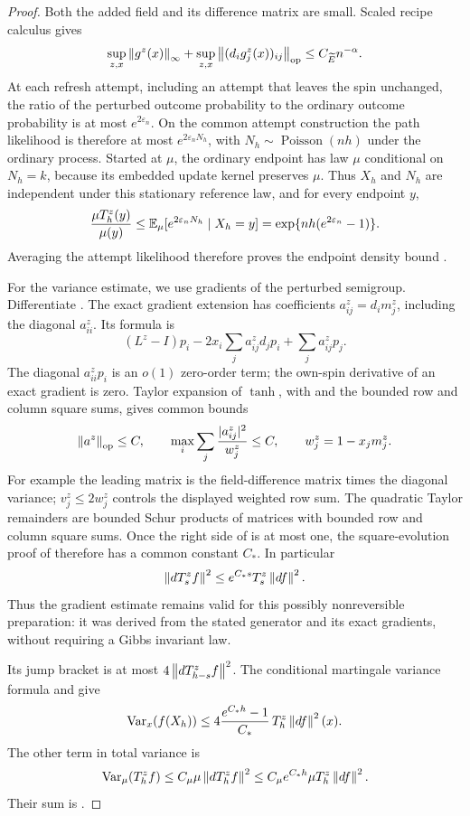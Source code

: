\begin{proof}
Both the added field and its difference matrix are small.  Scaled recipe
calculus gives
\begin{equation}
 \sup_{z,x}\left\lVert g^z(x)\right\rVert_\infty+
 \sup_{z,x}\left\lVert (d_i g_j^z(x))_{ij}\right\rVert_{\mathrm{op}}
 \le C_{\widetilde E}n^{-\alpha}.
 \label{eq:cutoff-small-perturbation}
\end{equation}
At each refresh attempt, including an attempt that leaves the spin
unchanged, the ratio of the perturbed outcome probability to the
ordinary outcome probability is at most $e^{2\varepsilon_n}$.
On the common attempt construction the path likelihood is therefore
at most $e^{2\varepsilon_n N_h}$, with
$N_h\sim\operatorname{Poisson}(nh)$ under the ordinary process.
Started at $\mu$, the ordinary endpoint has law $\mu$ conditional
on $N_h=k$, because its embedded update kernel preserves $\mu$.
Thus $X_h$ and $N_h$ are independent under this stationary reference
law, and for every endpoint $y$,
\[
 \frac{\mu T_h^z(y)}{\mu(y)}
 \le\mathbb E_\mu[e^{2\varepsilon_n N_h}\mid X_h=y]
 =\exp\{nh(e^{2\varepsilon_n}-1)\}.
\]
Averaging the attempt likelihood therefore proves the endpoint density
bound .

For the variance estimate, we use gradients of the perturbed semigroup.
Differentiate
.  The exact gradient
extension has coefficients $a_{ij}^z=d_im_j^z$, including the
diagonal $a_{ii}^z$.  Its formula is
\[
 (L^z-I)p_i-2x_i\sum_j a_{ij}^z d_jp_i+\sum_j a_{ij}^z p_j.
\]
The diagonal $a_{ii}^z p_i$ is an $o(1)$ zero-order term; the
own-spin derivative of an exact gradient is zero.  Taylor expansion
of $\tanh$, with  and the
bounded row and column square sums, gives common bounds
\[
 \left\lVert a^z\right\rVert_{\mathrm{op}}\le C,\qquad
 \max_i\sum_j\frac{|a_{ij}^z|^2}{w_j^z}\le C,
 \qquad w_j^z=1-x_jm_j^z.
\]
For example the leading matrix is the field-difference matrix times
the diagonal variance; $v_j^z\le2w_j^z$ controls the displayed
weighted row sum.  The quadratic Taylor remainders are bounded
Schur products of matrices with bounded row and column square sums.
Once the right side of  is at most
one, the square-evolution proof of  therefore
has a common constant $C_*$.  In particular
\begin{equation}
 \left\lVert dT_s^zf\right\rVert^2\le e^{C_*s}T_s^z\left\lVert df\right\rVert^2.
 \label{eq:cutoff-preparation-gradient}
\end{equation}
Thus the gradient estimate remains valid for this possibly nonreversible
preparation: it was derived from the stated generator and its exact
gradients, without requiring a Gibbs invariant law.

Its jump bracket is at most $4\left\lVert dT_{h-s}^zf\right\rVert^2$.
The conditional martingale variance formula and
 give
\[
 \operatorname{Var}_x(f(X_h))
 \le4\frac{e^{C_*h}-1}{C_*}\,T_h^z\left\lVert df\right\rVert^2(x).
\]
The other term in total variance is
\[
 \operatorname{Var}_\mu(T_h^zf)
 \le C_\mu\mu\left\lVert dT_h^zf\right\rVert^2
 \le C_\mu e^{C_*h}\mu T_h^z\left\lVert df\right\rVert^2.
\]
Their sum is .
\end{proof}

